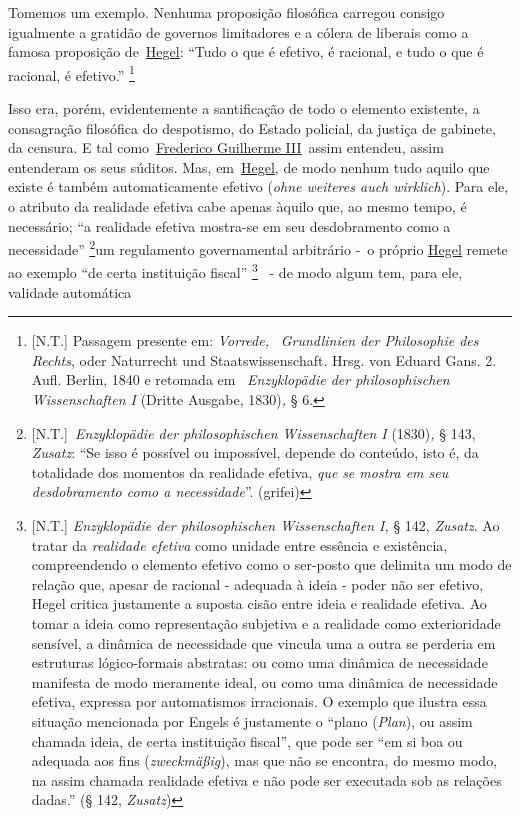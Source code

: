 Tomemos um exemplo. Nenhuma proposição filosófica carregou consigo
igualmente a gratidão de governos limitadores e a cólera de liberais
como a famosa proposição
de~\href{https://www.marxists.org/portugues/dicionario/verbetes/h/hegel.htm}{Hegel}:
``Tudo o que é efetivo, é racional, e tudo o que é racional, é
efetivo.'' \footnote{{[}N.T.{]} Passagem presente em: \emph{Vorrede,}
  ~\emph{Grundlinien der Philosophie des Rechts}, oder Naturrecht und
  Staatswissenschaft. Hrsg. von Eduard Gans. 2. Aufl. Berlin, 1840 e
  retomada em ~\emph{Enzyklopädie der philosophischen Wissenschaften I}
  (Dritte Ausgabe, 1830)\emph{,} § 6.}\protect\hypertarget{r2}{}{}

Isso era, porém, evidentemente a santificação de todo o elemento
existente, a consagração filosófica do despotismo, do Estado policial,
da justiça de gabinete, da censura. E tal
como~\href{https://www.marxists.org/portugues/dicionario/verbetes/f/frederico_guilerme_3.htm}{Frederico
Guilherme III}~assim entendeu, assim entenderam os seus súditos. Mas,
em~\href{https://www.marxists.org/portugues/dicionario/verbetes/h/hegel.htm}{Hegel},
de modo nenhum tudo aquilo que existe é também automaticamente efetivo
(\emph{ohne weiteres auch wirklich}). Para ele, o atributo da realidade
efetiva cabe apenas àquilo que, ao mesmo tempo, é necessário; ``a
realidade efetiva mostra-se em seu desdobramento como a
necessidade''\protect\hypertarget{r3}{}{} \footnote{{[}N.T.{]}~\emph{Enzyklopädie
  der philosophischen Wissenschaften I} (1830)\emph{,} § 143,
  \emph{Zusatz}: ``Se isso é possível ou impossível, depende do
  conteúdo, isto é, da totalidade dos momentos da realidade efetiva,
  \emph{que} \emph{se mostra em seu desdobramento como a necessidade}''.
  (grifei)}um regulamento governamental arbitrário -~o próprio
\href{https://www.marxists.org/portugues/dicionario/verbetes/h/hegel.htm}{Hegel}
remete ao exemplo ``de certa instituição
fiscal''\protect\hypertarget{r4}{}{} \footnote{{[}N.T.{]}
  \emph{Enzyklopädie der philosophischen Wissenschaften I,} § 142,
  \emph{Zusatz}. Ao tratar da \emph{realidade efetiva} como unidade
  entre essência e existência, compreendendo o elemento efetivo como o
  ser-posto que delimita um modo de relação que, apesar de racional -
  adequada à ideia - poder não ser efetivo, Hegel critica justamente a
  suposta cisão entre ideia e realidade efetiva. Ao tomar a ideia como
  representação subjetiva e a realidade como exterioridade sensível, a
  dinâmica de necessidade que vincula uma a outra se perderia em
  estruturas lógico-formais abstratas: ou como uma dinâmica de
  necessidade manifesta de modo meramente ideal, ou como uma dinâmica de
  necessidade efetiva, expressa por automatismos irracionais. O exemplo
  que ilustra essa situação mencionada por Engels é justamente o ``plano
  (\emph{Plan}), ou assim chamada ideia, de certa instituição fiscal'',
  que pode ser ``em si boa ou adequada aos fins (\emph{zweckmäßig}), mas
  que não se encontra, do mesmo modo, na assim chamada realidade efetiva
  e não pode ser executada sob as relações dadas.'' (§ 142,
  \emph{Zusatz})}~ - de modo algum tem, para ele, validade automática
